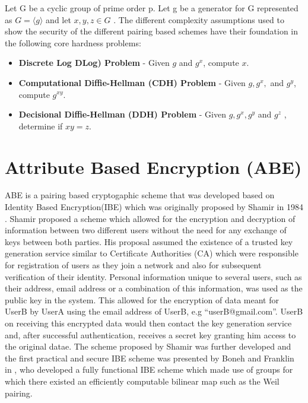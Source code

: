 Let G be a cyclic group of prime order p. Let g be a generator for G represented as $ G = \langle g \rangle $ and let $ x, y, z \in G $ . The different complexity assumptions used to show the security of the different pairing based schemes have their foundation in the following core hardness problems\cite{Lynn2007}:

\begin{itemize}
	
	\item \textbf{Discrete Log DLog) Problem} - Given $ g $ and $ g^{x} $, compute $ x $.
	
	\item \textbf{Computational Diffie-Hellman (CDH) Problem} - Given $ g, g^{x}, $ and $ g^{y} $, compute $ g^{xy} $.
	
	\item \textbf{Decisional Diffie-Hellman (DDH) Problem} - Given $ g, g^{x}, g^{y} $ and $ g^{z} $ , determine if $ xy = z $.	 
	
\end{itemize}

\section{Attribute Based Encryption (ABE)}

ABE is a pairing based cryptogaphic scheme that was developed based on Identity Based Encryption(IBE) which was originally proposed by Shamir in 1984 \cite{Shamir1985}. Shamir proposed a scheme which allowed for the encryption and decryption of information between two different users without the need for any exchange of keys between both parties. His proposal assumed the existence of a trusted key generation service similar to Certificate Authorities (CA) which were responsible for registration of users as they join a network and also for subsequent verification of their identity. Personal information unique to several users, such as their address, email address or a combination of this information, was used as the public key in the system. This allowed for the encryption of data meant for UserB by UserA using the email address of UserB, e.g “userB@gmail.com”. UserB on receiving this encrypted data would then contact the key generation service and, after successful authentication, receives a secret key granting him access to the original datae. The scheme proposed by Shamir was further developed and the first practical and secure IBE scheme was presented by Boneh and Franklin in \cite{Boneh2003}, who developed a fully functional IBE scheme which made use of groups for which there existed an efficiently computable bilinear map such as the Weil pairing.

